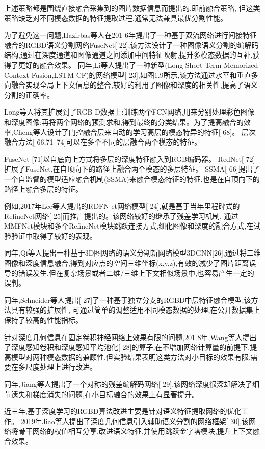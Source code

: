 \iffalse 
上述策略都是围绕直接融合采集到的图片数据信息而提出的,即前融合策略, 但这类策略缺乏对不同模态数据的特征提取过程,通常无法兼具最优分割性能。

为了避免这一问题,Hazirbas等人在201 6年提出了一种基于双流网络进行间接特征融合的RGBD语义分割网络FuseNet[ 22],该方法设计了一种图像语义分割的编解码结构,通过在深度通道和图像通道之间添加中间特征映射,提升多模态数据的互补,获得了更好的融合效果。
同年,Li等人提出了一种新型(Long Short-Term Memorized Context Fusion,LSTM-CF)的网络模型[ 23],如图1.9所示,该方法通过水平和垂直多向融合实现全局上下文信息的整合,较好的利用了图像和深度的相关性,提高了语义分割的正确率。 


Long等人将其扩展到了RGB-D数据上:训练两个FCN网络,用来分别处理彩色图像和深度图像;再将两个网络的预测求和,得到最终的分类结果。为了提高融合的效率,Cheng等人设计了门控融合层来自动的学习高层的模态特异的特征[ 68]。
层次融合方法[ 66,71–74]可以在多个不同的层融合两个模态的特征。


FuseNet [71]以自底向上方式将多层的深度特征融入到RGB编码器。
RedNet[ 72]扩展了FuseNet,在自顶向下的路径上融合两个模态的多层特征。
SSMA[ 66]提出了一个自监督的模型适应融合机制(SSMA)来融合模态特征的特征,也是在自顶向下的路径上融合多层的特征。


例如,2017年Lee等人提出的RDFN et网络模型[ 24],就是基于当年里程碑式的RefineNet网络[ 25]而推广提出的。该网络较好的继承了残差学习机制, 通过MMFNet模块和多个RefineNet模块跳跃连接方式,细化图像和深度的融合方式,在试验验证中取得了较好的表现。

同年,Qi等人提出一种基于3D图网络的语义分割新网络模型3DGNN[26],通过将二维图像和深度信息融合,得到对应点的空间三维坐标(x,y,z),有效的减少了图片距离误导的错误发生,但在复杂场景或者二维/三维上下文相似场景中,也容易产生一定的误判。

同年,Schneider等人提出[ 27]了一种基于独立分支的RGBD中层特征融合模型,该方法具有较强的扩展性, 可通过简单的调整适用不同模态数据的处理,在公开数据集上保持了较高的性能指标。

针对深度几何信息在固定卷积神经网络上效果有限的问题,201 8年,Wang等人提出了深度感知卷积和深度感知平均池化[ 28]的算子,在不增加网络计算量的前提下,提高模型对两种模态数据的兼顾性,但实验结果表明这类方法对小目标的效果有限,需要在多尺度处理上进行改进。

同年,Jiang等人提出了一个对称的残差编解码网络[ 29],该网络深度很深却解决了细节遗失和梯度消失的问题,在小目标融合的效果上有显著提升。

近三年,基于深度学习的RGBD算法改进主要是针对语义特征提取网络的优化工作。
2019年Jiao等人提出了深度几何信息引入辅助语义分割的网络框架[ 30],该网络将骨干网络的权值相互分享,改进语义特征,并使用跳跃金字塔模块,提升上下文融合效果。

